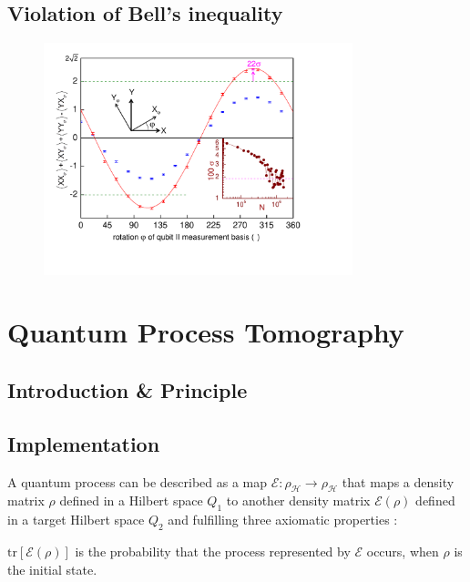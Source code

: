 \subsection{Violation of Bell's inequality}

\begin{figure}
	\centering
		\includegraphics[width=0.8\textwidth]{./material/papers/iswap/figures/chsh}
	\label{fig:CHSH}
	\caption{}
\end{figure}

\section{Quantum Process Tomography}

\subsection{Introduction \& Principle}

\subsection{Implementation}

A quantum process can be described as a map $\mathcal{E} : \rho_\mathcal{H} \to \rho_\mathcal{H}$ that maps a density matrix $\rho$ defined in a Hilbert space $Q_1$ to another density matrix $\mathcal{E}(\rho)$ defined in a target Hilbert space $Q_2$ and fulfilling three axiomatic properties \cite{michael_a._nielsen_quantum_2000,haroche_exploring_2006}:

\begin{axiom}
$\mathrm{tr}\left[\mathcal{E}(\rho)\right]$ is the probability that the process represented by $\mathcal{E}$ occurs, when $\rho$ is the initial state.
\end{axiom}

